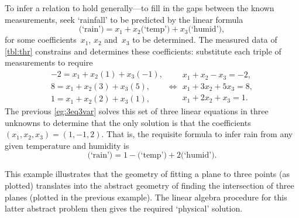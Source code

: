 \begin{example}
\begin{solution} 
To infer a relation to hold generally---to fill in the gaps between the known measurements, seek `rainfall' to be predicted by the linear formula
\begin{equation*}
\text{(`rain')}=x_1+x_2\text{(`temp')}+x_3\text{(`humid')},
\end{equation*}
for some coefficients~\(x_1\), \(x_2\) and~\(x_3\) to be determined.
The measured data of \cref{tbl:thr} constrains and determines these coefficients:
substitute each triple of measurements to require
\begin{equation*}
\begin{array}{l}
-2=x_1+x_2(1)+x_3(-1),
\\ 8=x_1+x_2(3)+x_3(5),
\\1=x_1+x_2(2)+x_3(1),
\end{array}
\iff
\begin{array}{l}
x_1+x_2-x_3=-2,
\\ x_1+3x_2+5x_3=8,
\\x_1+2x_2+x_3=1.
\end{array}
\end{equation*}
The previous \cref{eg:3eq3var} solves this set of three linear equations in three unknowns to determine that the only solution is that the coefficients \((x_1,x_2,x_3)=(1,-1,2)\).
That is, the requisite formula to infer rain from any given temperature and humidity is 
\begin{equation*}
\text{(`rain')}=1-\text{(`temp')}+2\text{(`humid')}.
\end{equation*}

This example illustrates that the geometry of fitting a plane to three points (as plotted) translates into the abstract geometry of finding the intersection of three planes (plotted in the previous example).
The linear algebra procedure for this latter abstract problem then gives the required `physical' solution.
\end{solution}
\end{example}


